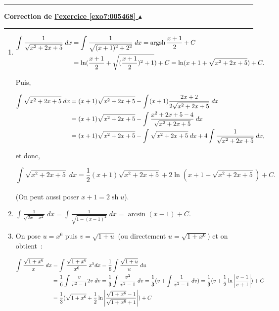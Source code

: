\documentclass[11pt,a4paper]{article}
\newcommand{\sh}{\mathop{\mathrm{sh}}\nolimits}
\newcommand{\Arcsin}{\mathop{\mathrm{arcsin}}\nolimits}
\newcommand{\Argsh}{\mathop{\mathrm{argsh}}\nolimits}
\newcounter{exo}
\newcommand{\correction}[1]{\hypertarget{cor7:#1}{}\label{cor7:#1}{\bf Correction de \hyperlink{exo7:#1}{l'exercice \ref{exo7:#1} $\blacktriangle$}}\vspace{1mm}\hrule\vspace{1mm}}
\newcommand{\fincorrection}{\vspace{1mm}\hrule\vspace*{7mm}}
\begin{document}
\fincorrection
\correction{005468}
\begin{enumerate}
\item  
\begin{align*}\ensuremath
\int_{}^{}\frac{1}{\sqrt{x^2+2x+5}}\;dx&=\int_{}^{}\frac{1}{\sqrt{(x+1)^2+2^2}}\;dx=\Argsh\frac{x+1}{2}+C\\
 &=\ln(\frac{x+1}{2}+\sqrt{(\frac{x+1}{2})^2+1})+C=\ln(x+1+\sqrt{x^2+2x+5})+C.
\end{align*}

Puis,

\begin{align*}\ensuremath
\int_{}^{}\sqrt{x^2+2x+5}\;dx&=(x+1)\sqrt{x^2+2x+5}-\int_{}^{}(x+1)\frac{2x+2}{2\sqrt{x^2+2x+5}}\;dx\\
 &=(x+1)\sqrt{x^2+2x+5}-\int_{}^{}\frac{x^2+2x+5-4}{\sqrt{x^2+2x+5}}\;dx\\
 &=(x+1)\sqrt{x^2+2x+5}-\int_{}^{}\sqrt{x^2+2x+5}\;dx+4\int_{}^{}\frac{1}{\sqrt{x^2+2x+5}}\;dx,
\end{align*}

et donc,

$$\int_{}^{}\sqrt{x^2+2x+5}\;dx=\frac{1}{2}(x+1)\sqrt{x^2+2x+5}+2\ln(x+1+\sqrt{x^2+2x+5})+C.$$

(On peut aussi poser $x+1=2\sh u$).

\item  $\int_{}^{}\frac{1}{\sqrt{2x-x^2}}\;dx=\int_{}^{}\frac{1}{\sqrt{1-(x-1)^2}}\;dx=\Arcsin(x-1)+C$.

\item  On pose $u=x^6$ puis $v=\sqrt{1+u}$ (ou directement $u=\sqrt{1+x^6}$) et on obtient~:

\begin{align*}\ensuremath
\int_{}^{}\frac{\sqrt{1+x^6}}{x}\;dx&=\int_{}^{}\frac{\sqrt{1+x^6}}{x^6}\;x^5dx=\frac{1}{6}\int_{}^{}\frac{\sqrt{1+u}}{u}\;du\\
 &=\frac{1}{6}\int_{}^{}\frac{v}{v^2-1}2v\;dv=\frac{1}{3}\int_{}^{}\frac{v^2}{v^2-1}\;dv=\frac{1}{3}(v+\int_{}^{}\frac{1}{v^2-1}\;dv)
=\frac{1}{3}(v+\frac{1}{2}\ln\left|\frac{v-1}{v+1}\right|)+C\\
 &=\frac{1}{3}(\sqrt{1+x^6}+\frac{1}{2}\ln\left|\frac{\sqrt{1+x^6}-1}{\sqrt{1+x^6}+1}\right|)+C\\
\end{align*}


\end{enumerate}
\end{document}
